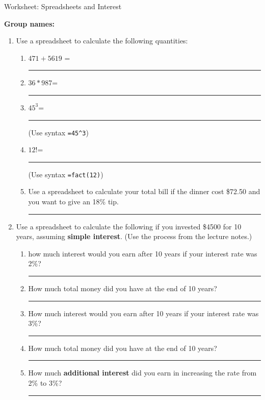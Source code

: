 \documentclass[12pt]{article}
\renewcommand{\emph}[1]{\textsf{\textbf{#1}}} %
\newcommand{\ans}[1][1in]{\rule{#1}{.5pt}}
\newcommand{\be}{\begin{enumerate}}
\newcommand{\ee}{\end{enumerate}}
\begin{document}
\begin{center}
{\Large  Worksheet: Spreadsheets and Interest}
\end{center}



\noindent \textbf{Group names:} \hrulefill \\



\begin{enumerate}

\item Use a spreadsheet to calculate the following quantities:
\be
\item $471+5619$ = \ans
\item $36*987$= \ans
\item $45^{3}$= \ans (Use syntax \verb`=45^3`)
\item $12!$= \ans (Use syntax \verb`=fact(12)`)
\item Use a spreadsheet to calculate your total bill if the dinner cost \$72.50 and you want to give an 18\% tip. \ans

\ee

\singlespacing

\item Use a spreadsheet to calculate the following if you invested \$4500  for 10 years, assuming \emph{simple interest}.  (Use the process from the lecture notes.)

\onehalfspacing
\be
\item how much interest would you earn after 10 years if your interest rate was 2\%? \ans

\item How much total money did you have at the end of 10 years? \ans

\item How much interest would you earn after 10 years if your interest rate was 3\%? \ans

\item How much total money did you have at the end of 10 years? \ans

\item How much \emph{additional interest} did you earn in increasing the rate from 2\% to 3\%? \ans

\ee


\end{enumerate}
\end{document}

